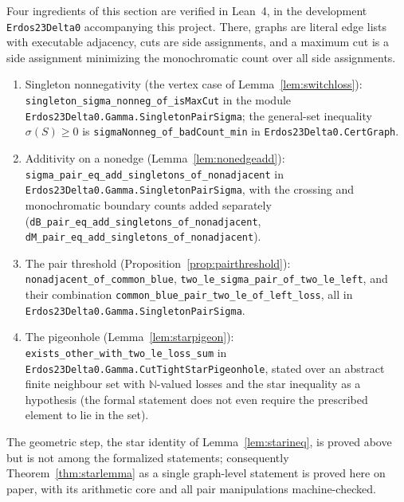 \begin{remark}[Formalization]\label{rem:leanstar}
Four ingredients of this section are verified in Lean~4, in the
development \texttt{Erdos23Delta0} accompanying this project. There,
graphs are literal edge lists with executable adjacency, cuts are side
assignments, and a maximum cut is a side assignment minimizing the
monochromatic count over all side assignments.
\begin{enumerate}[label=\textup{(\roman*)}]
\item Singleton nonnegativity (the vertex case of
Lemma~\ref{lem:switchloss}):
\texttt{singleton\_sigma\_nonneg\_of\_isMaxCut} in the module
\texttt{Erdos23Delta0.Gamma.SingletonPairSigma}; the general-set
inequality \(\sigma(S)\ge0\) is
\texttt{sigmaNonneg\_of\_badCount\_min} in
\texttt{Erdos23Delta0.CertGraph}.
\item Additivity on a nonedge (Lemma~\ref{lem:nonedgeadd}):
\texttt{sigma\_pair\_eq\_add\_singletons\_of\_nonadjacent} in
\texttt{Erdos23Delta0.Gamma.SingletonPairSigma}, with the crossing and
monochromatic boundary counts added separately
(\texttt{dB\_pair\_eq\_add\_singletons\_of\_nonadjacent},
\texttt{dM\_pair\_eq\_add\_singletons\_of\_nonadjacent}).
\item The pair threshold (Proposition~\ref{prop:pairthreshold}):
\texttt{nonadjacent\_of\_common\_blue},
\texttt{two\_le\_sigma\_pair\_of\_two\_le\_left}, and their combination
\texttt{common\_blue\_pair\_two\_le\_of\_left\_loss}, all in
\texttt{Erdos23Delta0.Gamma.SingletonPairSigma}.
\item The pigeonhole (Lemma~\ref{lem:starpigeon}):
\texttt{exists\_other\_with\_two\_le\_loss\_sum} in
\texttt{Erdos23Delta0.Gamma.CutTightStarPigeonhole}, stated over an
abstract finite neighbour set with \(\mathbb N\)-valued losses and the
star inequality as a hypothesis (the formal statement does not even
require the prescribed element to lie in the set).
\end{enumerate}
The geometric step, the star identity of Lemma~\ref{lem:starineq}, is
proved above but is not among the formalized statements; consequently
Theorem~\ref{thm:starlemma} as a single graph-level statement is proved
here on paper, with its arithmetic core and all pair manipulations
machine-checked.
\end{remark}
